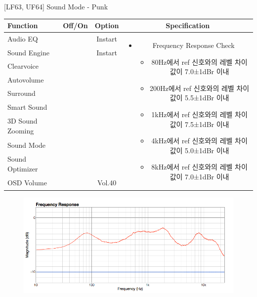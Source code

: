 \begin{frame}[t]{[LF63, UF64] Sound Mode - Punk}
\begin{tiny}
\begin{tabular}{@{}lccc@{}}
\toprule
Function & Off/On & Option & Specification \\
\midrule
Audio EQ & \color{black}{Off} & Instart &
\multirow{10}{60mm}{
\begin{itemize}
\item Frequency Response Check
	\begin{itemize}
	\item 80Hz에서 ref 신호와의 레벨 차이값이 7.0±1dBr 이내
	\item 200Hz에서 ref 신호와의 레벨 차이값이 5.5±1dBr 이내
	\item 1kHz에서 ref 신호와의 레벨 차이값이 7.5±1dBr 이내
	\item 4kHz에서 ref 신호와의 레벨 차이값이 5.0±1dBr 이내
	\item 8kHz에서 ref 신호와의 레벨 차이값이 7.0±1dBr 이내
	\end{itemize}
\end{itemize}
} \\
Sound Engine & \color{blue}{On} & Instart & \\
Clearvoice & \color{black}{Off} & & \\
Autovolume & \color{black}{Off} & & \\
Surround & \color{black}{Off} & & \\
Smart Sound & \color{black}{Off} & & \\
3D Sound Zooming & \color{black}{Off} & & \\
Sound Mode & \color{blue}{On} & \color{blue}{Punk} & \\
Sound Optimizer & \color{black}{Off} & & \\
OSD Volume & \color{blue}{On} & Vol.40 & \\
\midrule
\end{tabular}
\end{tiny}

\begin{figure}[b]
\includegraphics[height=0.4\textwidth]{figures/punk.png}
\end{figure}

\end{frame}
